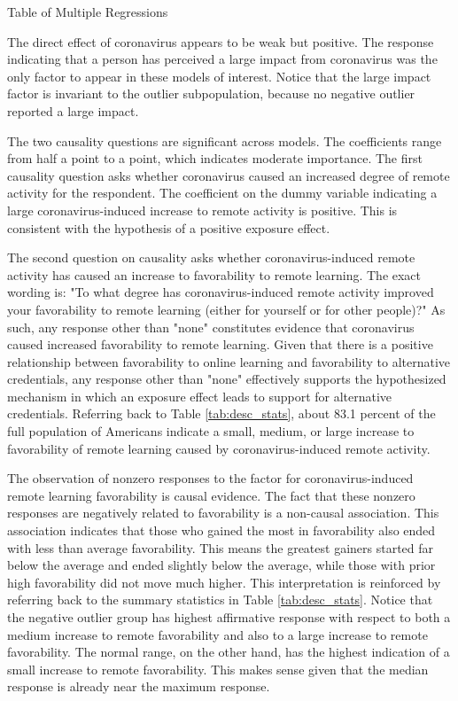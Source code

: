 \documentclass[review]{elsarticle}
\begin{document}
\begin{table}
    \caption{Table of Multiple Regressions}
    \resizebox{\columnwidth}{!}{
        
    }
    \label{tab:multiple_regs}
\end{table}

The direct effect of coronavirus appears to be weak but positive.
The response indicating that a person has perceived a large impact from coronavirus was the only factor to appear in these models of interest.
Notice that the large impact factor is invariant to the outlier subpopulation,
because no negative outlier reported a large impact.

The two causality questions are significant across models.
The coefficients range from half a point to a point, which indicates moderate importance.
The first causality question asks whether coronavirus caused an increased degree of remote activity for the respondent.
The coefficient on the dummy variable indicating a large coronavirus-induced increase to remote activity is positive.
This is consistent with the hypothesis of a positive exposure effect.

The second question on causality asks whether coronavirus-induced remote activity has caused an increase
to favorability to remote learning.
The exact wording is:
"To what degree has coronavirus-induced remote activity improved your favorability to remote learning
(either for yourself or for other people)?"
As such, any response other than "none" constitutes evidence that coronavirus caused increased favorability to remote learning.
Given that there is a positive relationship between favorability to online learning and favorability to alternative credentials,
any response other than "none" effectively supports the hypothesized mechanism in which an exposure effect leads to support for alternative credentials.
Referring back to Table \ref{tab:desc_stats},
about 83.1 percent of the full population of Americans indicate a small,
medium, or large increase to favorability of remote learning
caused by coronavirus-induced remote activity.

The observation of nonzero responses to the factor for coronavirus-induced remote learning favorability is causal evidence.
The fact that these nonzero responses are negatively related to favorability is a non-causal association.
This association indicates that those who gained the most in favorability also ended with less than average favorability.
This means the greatest gainers started far below the average and ended slightly below the average,
while those with prior high favorability did not move much higher.
This interpretation is reinforced by referring back to the summary statistics in Table \ref{tab:desc_stats}.
Notice that the negative outlier group has highest affirmative response with respect to both a
medium increase to remote favorability
and also to a large increase to remote favorability.
The normal range, on the other hand, has the highest indication of a small increase to remote favorability.
This makes sense given that the median response is already near the maximum response.
\end{document}
